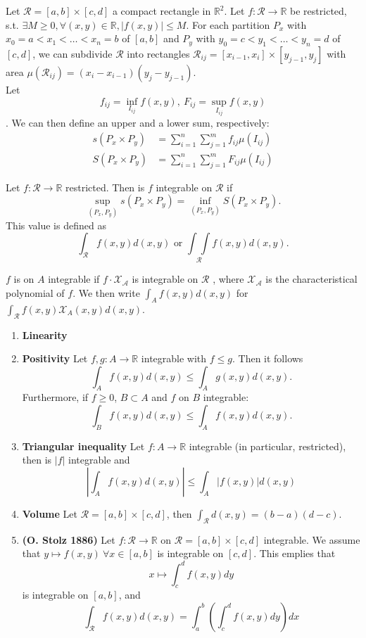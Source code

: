 \documentclass[10pt,landscape, a4paper]{article}
\newcommand{\custombox}[3]{\begin{tcolorbox}[left=0mm,right=0mm,bottom=0mm,top=0mm,title = \textbf{#1}, colback=#2!10!white, colframe = #2!70!white, coltitle=white, breakable]
    #3
    \end{tcolorbox}}
\newcommand{\definition}[2]{\custombox{Definition #1}{red}{#2}}
\newcommand{\other}[2]{\custombox{#1}{green!60!black}{#2}}
\newcommand{\R}{\mathbb{R}}
\begin{document}
\begin{multicols*}{3}
    \definition{Integral on a rectangle}{
    Let $\mathcal{R} = [a,b]\times [c,d]$ a compact rectangle in $\R^2$. Let $f:\mathcal{R} \to \R$  be restricted, s.t. $\exists M \geqslant 0, \forall (x,y)\in \R, |f(x,y)|\leqslant M$.
    For each partition $P_x$ with $x_0 = a<x_1<\dots <x_n=b$ of $[a,b]$ and $P_y$ with $y_0 = c < y_1 < \dots <y_n = d$ of $[c,d]$, we can subdivide $\mathcal{R}$ into rectangles $\mathcal{R}_{ij} = [x_{i-1},x_i]\times [y_{j-1},y_j]$ with area $\mu(\mathcal{R}_{ij}) = (x_i-x_{i-1})(y_j-y_{j-1})$.\\
    Let $$f_{ij} = \inf_{I_{ij}}f(x,y),\ F_{ij} = \sup_{I_{ij}}f(x,y)$$.
    We can then define an upper and a lower sum, respectively:
    \begin{align*}
        s(P_x\times P_y) & = \sum_{i=1}^n \sum_{j=1}^m f_{ij}\mu(I_{ij}) \\
        S(P_x\times P_y) & = \sum_{i=1}^n \sum_{j=1}^m F_{ij}\mu(I_{ij})
    \end{align*}
    }

    \definition{Riemann integrable in $\R^2$}{
        Let $f: \mathcal{R}\to \R$ restricted. Then is $f$ integrable on $\mathcal{R}$ if $$\sup_{(P_x,P_y)} s(P_x\times P_y)=\inf_{(P_x,P_y)}  S(P_x\times P_y).$$
        This value is defined as $$
            \int_\mathcal{R}f(x,y)d(x,y) \text{ or } \underset{\mathcal{R}}{\int \int} f(x,y)d(x,y).
        $$
    }

    \definition{Riemann integrable and characteristical funciton}{
        $f$ is on $A$ integrable if $f\cdot \mathcal{X_A}$ is integrable on $\mathcal{R}$ , where $\mathcal{X_A}$ is the characteristical polynomial of $f$. We then write $\int_A f(x,y)d(x,y)$ for $\int_\mathcal{R} f(x,y) \mathcal{X}_A(x,y)d(x,y)$.
    }

    \other{Riemann integral's properties}{
        \begin{enumerate}[label=(\arabic*)]
            \item \textbf{Linearity}
            \item \textbf{Positivity} Let $f,g: A \to \R$ integrable with $f\leqslant g$. Then it follows $$\int_Af(x,y)d(x,y) \leqslant \int_Ag(x,y)d(x,y).$$ Furthermore, if $f\geqslant 0$, $B\subset A$ and $f$ on $B$ integrable:$$\int_Bf(x,y)d(x,y) \leqslant \int_Af(x,y)d(x,y).$$
            \item \textbf{Triangular inequality} Let $f:A\to \R$ integrable (in particular, restricted), then is $|f|$ integrable and $$\left|\int_Af(x,y)d(x,y)\right|\leqslant \int_A\left|f(x,y)\right|d(x,y)$$ 
            \item \textbf{Volume} Let $\mathcal{R} = [a,b]\times [c,d]$, then $\int_\mathcal{R}d(x,y) = (b-a)(d-c)$.
            \item \textbf{(O. Stolz 1886)}  Let $f:\mathcal{R}\to \R$ on $\mathcal{R} = [a,b]\times [c,d]$ integrable. We assume that $y\mapsto f(x,y)\ \forall x\in[a,b]$ is integrable on $[c,d]$. This emplies that $$ x\mapsto \int_c^df(x,y)dy$$ is integrable on $[a,b]$, and $$\int_\mathcal{R} f(x,y)d(x,y) = \int_a^b\left(\int_c^df(x,y)dy\right)dx$$
        \end{enumerate}
    }
    
\end{multicols*}
\end{document}

